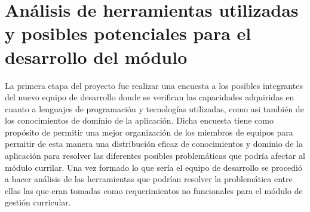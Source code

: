 \section{Análisis de herramientas utilizadas y posibles potenciales para el desarrollo del módulo}
La primera etapa del proyecto fue realizar una encuesta a los posibles integrantes del nuevo equipo de desarrollo donde se verifican las capacidades adquiridas en cuanto a lenguajes de programación y tecnologías utilizadas, como asi también de los conocimientos de dominio de la aplicación.
Dicha encuesta tiene como propósito de permitir una mejor organización de los miembros de equipos para permitir de esta manera una distribución eficaz de conocimientos y dominio de la aplicación para resolver las diferentes posibles problemáticas que podría afectar al módulo currilar.
Una vez formado lo que sería el equipo de desarrollo se procedió a hacer análisis de las herramientas que podrían resolver la problemática entre ellas las que eran tomadas como requerimientos no funcionales para el módulo de gestión curricular.